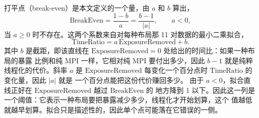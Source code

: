 \documentclass[11pt,a4paper,oneside]{report}
\begin{document}
打平点（break-even）是本文定义的一个量，由 $a$ 和 $b$ 算出，
\[
  \mathrm{BreakEven} = \frac{1-b}{a} = \frac{b-1}{|a|}, \qquad a<0,
\]
当 $a\ge0$ 时不存在。这两个系数来自对每种布局那 11 对数据的最小二乘拟合，
\[
  \mathrm{TimeRatio} = a\,\mathrm{ExposureRemoved} + b .
\]
其中 $b$ 是截距，即该直线在 $\mathrm{ExposureRemoved}=0$ 处给出的时间比：如果一种布局的暴露
比例和纯 MPI 一样，它相对纯 MPI 要付出多少，因此 $b-1$ 就是纯粹线程化的代价。斜率 $a$ 是
$\mathrm{ExposureRemoved}$ 每变化一个百分点时 $\mathrm{TimeRatio}$ 的变化量，因此 $|a|$ 就是
一个百分点能把这份代价赚回多少。
由于 $a<0$，拟合直线正好在 $\mathrm{ExposureRemoved}$ 越过 $\mathrm{BreakEven}$ 的
地方降到 1 以下。因此这一列是一个阈值：它表示一种布局要把暴露减少多少，线程化才开始划算，这个
值越低就越早划算。拟合只是描述性的，因此单个点可能落在它错误的一侧。
\end{document}
